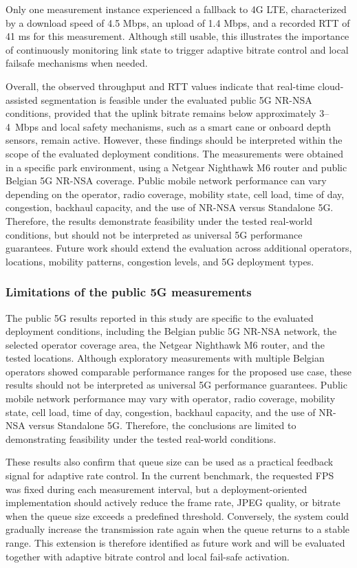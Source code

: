 \documentclass{ieeeaccess}
\begin{document}
Only one measurement instance experienced a fallback to 4G LTE, characterized by a download speed of 4.5 Mbps, an upload of 1.4 Mbps, and a recorded RTT of 41 ms for this measurement. Although still usable, this illustrates the importance of continuously monitoring link state to trigger adaptive bitrate control and local failsafe mechanisms when needed.  

Overall, the observed throughput and RTT values indicate that real-time cloud-assisted segmentation is feasible under the evaluated public 5G NR-NSA conditions, provided that the uplink bitrate remains below approximately 3--4~Mbps and local safety mechanisms, such as a smart cane or onboard depth sensors, remain active. However, these findings should be interpreted within the scope of the evaluated deployment conditions. The measurements were obtained in a specific park environment, using a Netgear Nighthawk M6 router and public Belgian 5G NR-NSA coverage. Public mobile network performance can vary depending on the operator, radio coverage, mobility state, cell load, time of day, congestion, backhaul capacity, and the use of NR-NSA versus Standalone 5G. Therefore, the results demonstrate feasibility under the tested real-world conditions, but should not be interpreted as universal 5G performance guarantees. Future work should extend the evaluation across additional operators, locations, mobility patterns, congestion levels, and 5G deployment types.

\subsubsection{Limitations of the public 5G measurements}

The public 5G results reported in this study are specific to the evaluated deployment conditions, including the Belgian public 5G NR-NSA network, the selected operator coverage area, the Netgear Nighthawk M6 router, and the tested locations. Although exploratory measurements with multiple Belgian operators showed comparable performance ranges for the proposed use case, these results should not be interpreted as universal 5G performance guarantees. Public mobile network performance may vary with operator, radio coverage, mobility state, cell load, time of day, congestion, backhaul capacity, and the use of NR-NSA versus Standalone 5G. Therefore, the conclusions are limited to demonstrating feasibility under the tested real-world conditions.


These results also confirm that queue size can be used as a practical feedback signal for adaptive rate control. In the current benchmark, the requested FPS was fixed during each measurement interval, but a deployment-oriented implementation should actively reduce the frame rate, JPEG quality, or bitrate when the queue size exceeds a predefined threshold. Conversely, the system could gradually increase the transmission rate again when the queue returns to a stable range. This extension is therefore identified as future work and will be evaluated together with adaptive bitrate control and local fail-safe activation.
\end{document}
